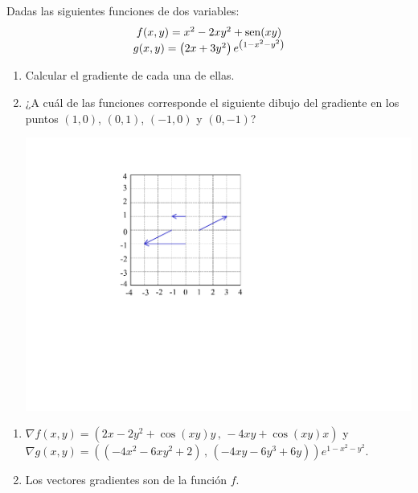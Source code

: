 {Dadas las siguientes funciones de dos variables:
\[
\begin{array}{*{20}c}
   {f(x,y) = x^2  - 2xy^2  + \sen(xy)}  \\
   {g(x,y) = \left( {2x+ 3y^2 } \right)e^{\left( {1 - x^2  - y^2 } \right)} }  \\

 \end{array}
\]
\begin{enumerate}
\item Calcular el gradiente de cada una de ellas.
\item ¿A cuál de las funciones corresponde el siguiente dibujo del gradiente en los puntos $(1,0)$, $(0,1)$, $(-1,0)$ y $(0,-1)$?
\begin{center}
\includegraphics[scale=0.45,angle=270]{img/vectores-par-13}
\end{center}
\end{enumerate}
}
{\begin{enumerate}
\item $\nabla f(x,y) = \left(2x-2y^2+\cos(xy)y\, ,\, -4xy+\cos(xy)x\right)$  y 
$\nabla g(x,y) = \left((-4x^2-6xy^2+2)\, ,\, (-4xy-6y^3+6y)\right)e^{1-x^2-y^2}$.
\item Los vectores gradientes son de la función $f$. 
\end{enumerate}
}
